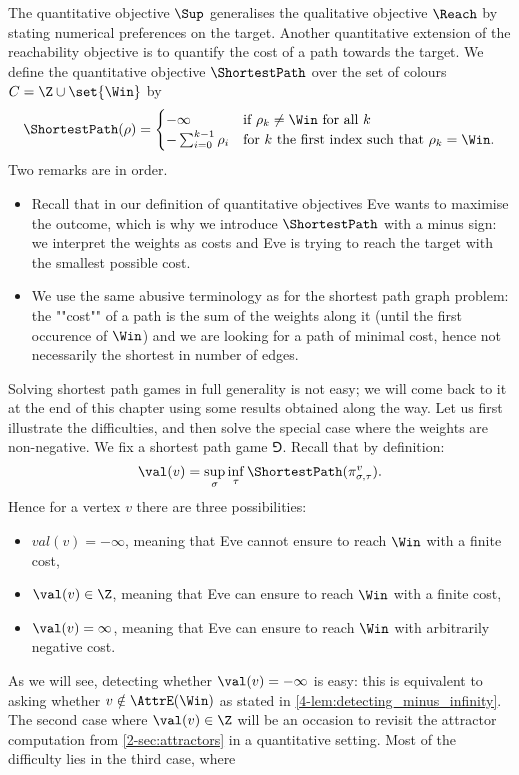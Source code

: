 The quantitative objective $\Sup$ generalises the qualitative
objective $\Reach$ by stating numerical preferences on the target. 
Another quantitative extension of the reachability objective is to quantify the cost of a path towards the target.
We define the quantitative objective $\ShortestPath$ over the set of colours $C = \Z \cup \set{\Win}$ by
\[
\ShortestPath(\rho) =
  \begin{cases}
    - \infty & \text{if } \rho_k \neq \Win \text{ for all } k \\
    - \sum_{i = 0}^{k-1} \rho_i & \text{for $k$ the first index such that } \rho_k = \Win.
  \end{cases}
\]
Two remarks are in order.
\begin{itemize}
	\item Recall that in our definition of quantitative objectives Eve wants to maximise the outcome,
which is why we introduce $\ShortestPath$ with a minus sign:
we interpret the weights as costs and Eve is trying to reach the target with the smallest possible cost.
	\item We use the same abusive terminology as for the shortest path graph problem: the ""cost"" of a path is the sum of the weights along it
(until the first occurence of $\Win$) and we are looking for a path of minimal cost, hence not necessarily the shortest in number of edges.
\end{itemize}

Solving shortest path games in full generality is not easy; we will come back to it at the end of this chapter using some results obtained along the way.
Let us first illustrate the difficulties, and then solve the special case where the weights are non-negative.
We fix a shortest path game $\Game$.
Recall that by definition:
\[
\val(v) = \sup_{\sigma} \inf_{\tau} \ShortestPath(\pi^v_{\sigma,\tau}).
\]
Hence for a vertex $v$ there are three possibilities: 
\begin{itemize}
	\item $val(v) = -\infty$, meaning that Eve cannot ensure to reach $\Win$ with a finite cost,
	\item $\val(v) \in \Z$, meaning that Eve can ensure to reach $\Win$ with a finite cost,
	\item $\val(v) = \infty$, meaning that Eve can ensure to reach $\Win$ with arbitrarily negative cost.
\end{itemize}
As we will see, detecting whether $\val(v) = -\infty$ is easy: this is equivalent to asking whether 
$v \notin \AttrE(\Win)$ as stated in \cref{4-lem:detecting_minus_infinity}.
The second case where $\val(v) \in \Z$ will be an occasion to revisit the attractor computation from \cref{2-sec:attractors}
in a quantitative setting.
Most of the difficulty lies in the third case, where 

